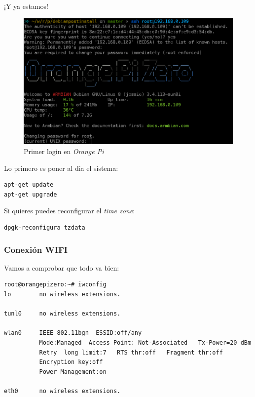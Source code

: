 \documentclass[12pt,spanish,]{scrartcl}
\begin{document}
¡Y ya estamos!

\begin{figure}
\centering
\includegraphics{src/img/OrangePiZero_FirstLogin.png}
\caption{Primer login en \emph{Orange Pi}}
\end{figure}

Lo primero es poner al dia el sistema:

\begin{verbatim}
apt-get update
apt-get upgrade
\end{verbatim}

Si quieres puedes reconfigurar el \emph{time zone}:

\begin{verbatim}
dpgk-reconfigura tzdata
\end{verbatim}

\hypertarget{conexiuxf3n-wifi}{%
\subsubsection{Conexión WIFI}\label{conexiuxf3n-wifi}}

Vamos a comprobar que todo va bien:

\begin{verbatim}
root@orangepizero:~# iwconfig
lo        no wireless extensions.

tunl0     no wireless extensions.

wlan0     IEEE 802.11bgn  ESSID:off/any
          Mode:Managed  Access Point: Not-Associated   Tx-Power=20 dBm
          Retry  long limit:7   RTS thr:off   Fragment thr:off
          Encryption key:off
          Power Management:on

eth0      no wireless extensions.
\end{verbatim}
\end{document}
